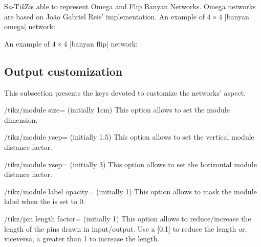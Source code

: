\documentclass{ltxdoc}
\newcommand\Tikz{Ti\textit kZ}
\newcommand{\saTikZ}{S\textit{a}-\Tikz}
\begin{document}
\saTikZ is able to represent Omega and Flip Banyan Networks. Omega networks are based on João Gabriel Reis' implementation.  An example of $4\times 4$ |banyan omega| network:
\begin{codeexample}[]
\begin{tikzpicture}
    \node[P=4,banyan omega] {};
\end{tikzpicture}
\end{codeexample}

An example of $4\times 4$ |banyan flip| network:
\begin{codeexample}[]
\begin{tikzpicture}
    \node[P=4,banyan flip] {};
\end{tikzpicture}
\end{codeexample}

\subsection{Output customization}
\label{subsec:customization}
This subsection presents the keys devoted to customize the networks' aspect.

\begin{key}{/tikz/module size= (initially 1cm)}
    This option allows to set the module dimension.
\end{key}

\begin{key}{/tikz/module ysep= (initially 1.5)}
    This option allows to set the vertical module distance factor.
\end{key}

\begin{key}{/tikz/module xsep= (initially 3)}
    This option allows to set the horizontal module distance factor.
\end{key}

\begin{key}{/tikz/module label opacity= (initially 1)}
    This option allows to mask the module label when the  is set to 0.
\end{key}

\begin{key}{/tikz/pin length factor= (initially 1)}
    This option allows to reduce/increase the length of the pins drawn in input/output. Use a  [0,1] to reduce the length or, viceversa, a  greater than 1 to increase the length.
\end{key}
\end{document}
